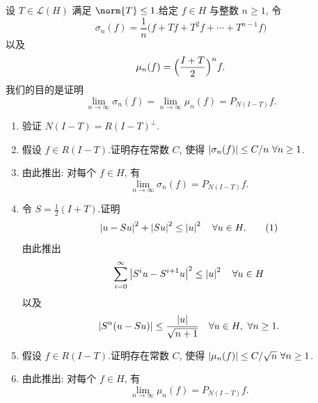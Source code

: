 \begin{exercise}
\label{exer:5.21}
设 $T\in\mathcal{L}(H)$ 满足 $\norm{T}\le1$.给定 $f\in H$ 与整数 $n\ge1$,
令
\begin{equation*}
\sigma_n(f)=\frac1n\bigl(f+Tf+T^2f+\cdots+T^{n-1}f\bigr)
\end{equation*}
以及
\begin{equation*}
\mu_n(f)=\Bigl(\frac{I+T}{2}\Bigr)^nf.
\end{equation*}
我们的目的是证明
\begin{equation*}
\lim_{n\to\infty}\sigma_n(f)=\lim_{n\to\infty}\mu_n(f)=P_{N(I-T)}f.
\end{equation*}
\begin{enumerate}[label=\arabic*., leftmargin=2.2em, itemsep=0.3em]
	\item 验证 $N(I-T)=R(I-T)^\perp$.
	\item 假设 $f\in R(I-T)$.证明存在常数 $C$, 使得
	      $\left|\sigma_n(f)\right|\le C/n\ \forall n\ge1$.
	\item 由此推出: 对每个 $f\in H$, 有
	      \begin{equation*}
	      \lim_{n\to\infty}\sigma_n(f)=P_{N(I-T)}f.
	      \end{equation*}
	\item 令 $S=\frac12(I+T)$.证明
	      \begin{equation}
	      \left|u-Su\right|^2+\left|Su\right|^2\le\left|u\right|^2\quad\forall u\in H.
	      \tag{1}
	      \end{equation}
	      由此推出
	      \begin{equation*}
	      \sum_{i=0}^\infty\left|S^iu-S^{i+1}u\right|^2\le\left|u\right|^2\quad\forall u\in H
	      \end{equation*}
	      以及
	      \begin{equation*}
	      \left|S^n(u-Su)\right|\le\frac{\left|u\right|}{\sqrt{n+1}}
	      \quad\forall u\in H,\ \forall n\ge1.
	      \end{equation*}
	\item 假设 $f\in R(I-T)$.证明存在常数 $C$, 使得
	      $\left|\mu_n(f)\right|\le C/\sqrt{n}\ \forall n\ge1$.
	\item 由此推出: 对每个 $f\in H$, 有
	      \begin{equation*}
	      \lim_{n\to\infty}\mu_n(f)=P_{N(I-T)}f.
	      \end{equation*}
\end{enumerate}
\end{exercise}

